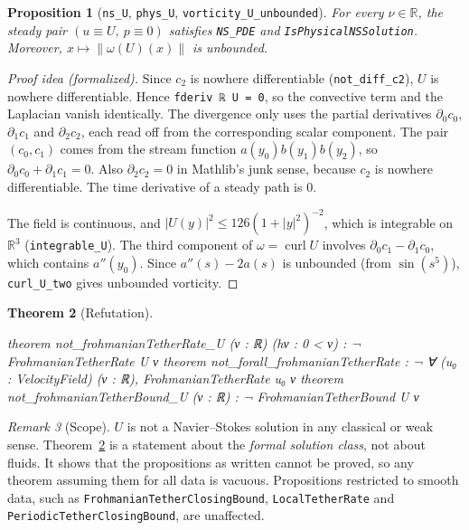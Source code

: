 \documentclass[11pt,a4paper]{article}
\newtheorem{theorem}{Theorem}[section]
\newtheorem{proposition}[theorem]{Proposition}
\theoremstyle{definition}
\theoremstyle{remark}
\newtheorem{remark}[theorem]{Remark}
\newcommand{\R}{\mathbb{R}}
\newcommand{\lean}[1]{\texttt{#1}}
\begin{document}
\begin{proposition}[\lean{ns\_U}, \lean{phys\_U}, \lean{vorticity\_U\_unbounded}]
For every $\nu\in\R$, the steady pair $(u\equiv U,\ p\equiv0)$ satisfies \lean{NS\_PDE} and \lean{IsPhysicalNSSolution}. Moreover, $x\mapsto\|\omega(U)(x)\|$ is unbounded.
\end{proposition}
\begin{proof}[Proof idea (formalized)]
Since $c_2$ is nowhere differentiable (\lean{not\_diff\_c2}), $U$ is nowhere differentiable. Hence \lean{fderiv ℝ U = 0}, so the convective term and the Laplacian vanish identically. The divergence only uses the partial derivatives $\partial_0 c_0$, $\partial_1 c_1$ and $\partial_2 c_2$, each read off from the corresponding scalar component. The pair $(c_0,c_1)$ comes from the stream function $a(y_0)b(y_1)b(y_2)$, so $\partial_0c_0+\partial_1c_1=0$. Also $\partial_2 c_2=0$ in Mathlib's junk sense, because $c_2$ is nowhere differentiable. The time derivative of a steady path is $0$.

The field is continuous, and $|U(y)|^2\le126(1+|y|^2)^{-2}$, which is integrable on $\R^3$ (\lean{integrable\_U}). The third component of $\omega=\operatorname{curl}U$ involves $\partial_0c_1-\partial_1c_0$, which contains $a''(y_0)$. Since $a''(s)-2a(s)$ is unbounded (from $\sin(s^5)$), \lean{curl\_U\_two} gives unbounded vorticity.
\end{proof}

\begin{theorem}[Refutation]\label{thm:refute}
\begin{leancode}
theorem not_frohmanianTetherRate_U (ν : ℝ) (hν : 0 < ν) :
    ¬ FrohmanianTetherRate U ν
theorem not_forall_frohmanianTetherRate :
    ¬ ∀ (u₀ : VelocityField) (ν : ℝ), FrohmanianTetherRate u₀ ν
theorem not_frohmanianTetherBound_U (ν : ℝ) : ¬ FrohmanianTetherBound U ν
\end{leancode}
\end{theorem}

\begin{remark}[Scope]
$U$ is not a Navier--Stokes solution in any classical or weak sense. Theorem~\ref{thm:refute} is a statement about the \emph{formal solution class}, not about fluids. It shows that the propositions as written cannot be proved, so any theorem assuming them for all data is vacuous. Propositions restricted to smooth data, such as \lean{FrohmanianTetherClosingBound}, \lean{LocalTetherRate} and \lean{PeriodicTetherClosingBound}, are unaffected.
\end{remark}
\end{document}
